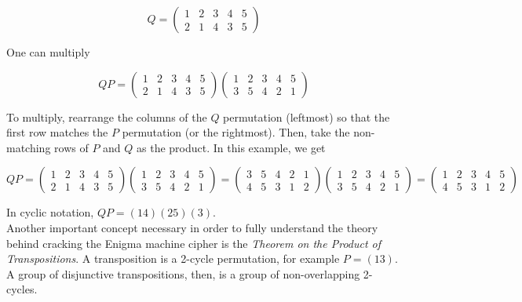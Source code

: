 $$Q = \begin{pmatrix}
    1 & 2 & 3 & 4 & 5 \\
    2 & 1 & 4 & 3 & 5
  \end{pmatrix}$$

One can multiply

$$QP = \begin{pmatrix}
    1 & 2 & 3 & 4 & 5 \\
    2 & 1 & 4 & 3 & 5
  \end{pmatrix}
  \begin{pmatrix}
    1 & 2 & 3 & 4 & 5 \\
    3 & 5 & 4 & 2 & 1
  \end{pmatrix}$$

To multiply, rearrange the columns of the $Q$ permutation (leftmost) so that the first row matches the $P$ permutation (or the rightmost). Then, take the non-matching rows of $P$ and $Q$ as the product. In this example, we get

$$QP = \begin{pmatrix}
    1 & 2 & 3 & 4 & 5 \\
    2 & 1 & 4 & 3 & 5
  \end{pmatrix}
  \begin{pmatrix}
    1 & 2 & 3 & 4 & 5 \\
    3 & 5 & 4 & 2 & 1
  \end{pmatrix} =
  \begin{pmatrix}
    3 & 5 & 4 & 2 & 1 \\
    4 & 5 & 3 & 1 & 2
  \end{pmatrix}
  \begin{pmatrix}
    1 & 2 & 3 & 4 & 5 \\
    3 & 5 & 4 & 2 & 1
  \end{pmatrix} =
  \begin{pmatrix}
    1 & 2 & 3 & 4 & 5 \\
    4 & 5 & 3 & 1 & 2
  \end{pmatrix}
  $$

In cyclic notation, $QP = (1 4)(2 5)(3)$.
\\

Another important concept necessary in order to fully understand the theory behind cracking the Enigma machine cipher is the \textit{Theorem on the Product of Transpositions}. A transposition is a 2-cycle permutation, for example $P = (13)$. A group of disjunctive transpositions, then, is a group of non-overlapping 2-cycles.
\\

